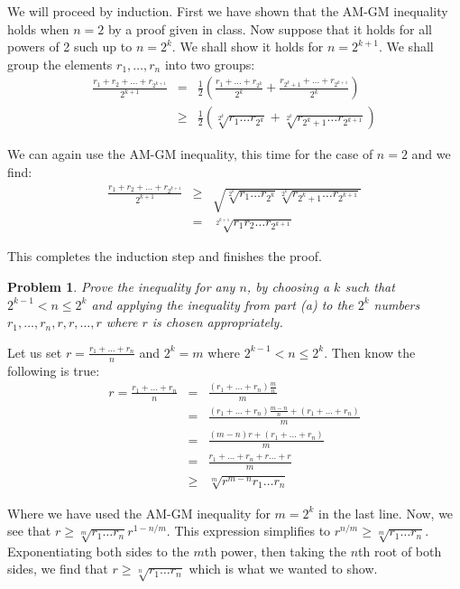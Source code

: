 \documentclass[psamsfonts]{amsart}
\newtheorem{prob}{Problem}[section]
\newenvironment{sol}{{\bfseries Solution}}{\qedsymbol}
\theoremstyle{definition}
\theoremstyle{remark}
\numberwithin{equation}{section}
\begin{document}
\begin{sol}
We will proceed by induction. First we have shown that the AM-GM inequality holds when $n= 2$ by a proof given in class. Now suppose that it holds for all powers of 2 such up to $n = 2^k$. We shall show it holds for $n = 2^{k+1}$. We shall group the elements $r_1, \ldots, r_n$ into two groups:
\begin{eqnarray}
\frac{r_1 + r_2 + \ldots + r_{2^{k+1}}}{2^{k+1}} &=& \frac{1}{2} \left( \frac{r_1 + \ldots + r_{2^k}}{2^k} + \frac{ r_{2^{k} + 1} + \ldots + r_{2^{k+1}}}{2^k} \right) \\
&\geq& \frac{1}{2} \left( \sqrt[2^{k}]{r_1 \ldots r_{2^k}} + \sqrt[2^k]{r_{2^k+1} \ldots r_{2^{k+1}}} \right)
\end{eqnarray}

We can again use the AM-GM inequality, this time for the case of $n =2$ and we find:
\begin{eqnarray}
\frac{r_1 + r_2 + \ldots + r_{2^{k+1}}}{2^{k+1}} &\geq& \sqrt{  \sqrt[2^{k}]{r_1 \ldots r_{2^k}}\sqrt[2^k]{r_{2^k+1} \ldots r_{2^{k+1}}} } \\
&=& \sqrt[2^{k+1}]{r_1 r_2 \ldots r_{2^{k+1}}} 
\end{eqnarray}

This completes the induction step and finishes the proof.
\end{sol}

\begin{prob}
Prove the inequality for any $n$, by choosing a $k$ such that $2^{k-1} < n \leq 2^k$ and applying the inequality from part (a) to the $2^k$ numbers $r_1, \ldots, r_n, r, r, \ldots, r$ where $r$ is chosen appropriately. 
\end{prob}

\begin{sol}
Let us set $r = \frac{r_1 + \ldots + r_n}{n}$ and $2^k = m$ where $2^{k-1} < n \leq 2^k$. Then know the following is true:
\begin{eqnarray}
r = \frac{r_1 + \ldots + r_n}{n} &=& \frac{(r_1 + \ldots + r_n) \frac{m}{n}}{m} \\
&=& \frac{(r_1 + \ldots + r_n) \frac{m - n}{n} + (r_1 + \ldots + r_n)}{m} \\
&=& \frac{(m-n) r + (r_1 + \ldots + r_n)}{m} \\
&=& \frac{r_1 + \ldots + r_n + r \ldots + r}{m} \\
&\geq& \sqrt[m]{r^{m-n} r_1 \ldots r_n}
\end{eqnarray}

Where we have used the AM-GM inequality for $m = 2^k$ in the last line. Now, we see that $r \geq \sqrt[m]{r_1 \ldots r_n} r^{1 - n/m}$. This expression simplifies to $r^{n/m} \geq \sqrt[m]{r_1 \ldots r_n}$. Exponentiating both sides to the $m$th power, then taking the $n$th root of both sides, we find that $r \geq \sqrt[n]{r_1 \ldots r_n}$ which is what we wanted to show.
\end{sol}
\end{document}
